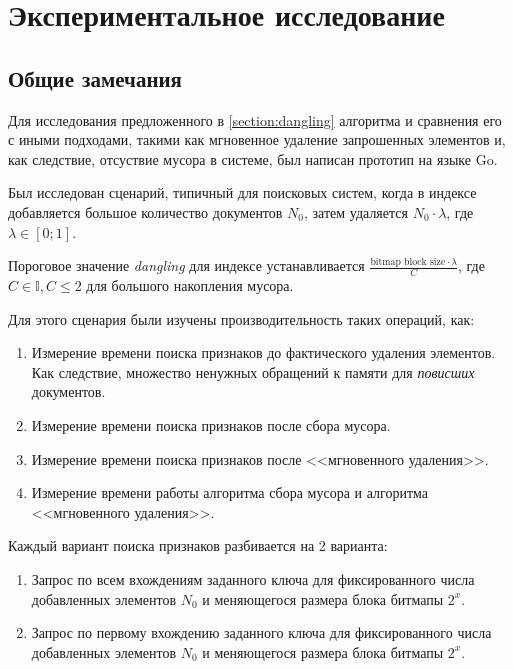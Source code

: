 \newpage
\section{Экспериментальное исследование}

\subsection{Общие замечания}

Для исследования предложенного в \cref{section:dangling} алгоритма и сравнения его с иными
подходами, такими как мгновенное удаление запрошенных элементов и, как следствие, отсуствие
мусора в системе, был написан прототип на языке Go.

Был исследован сценарий, типичный для поисковых систем, когда в индексе добавляется большое
количество документов $N_0$, затем удаляется $N_0\cdot \lambda$, где $\lambda \in [0; 1]$.

Пороговое значение \textit{dangling} для индексе устанавливается
$\frac{\text{bitmap block size} \cdot \lambda}{C}$, где $C \in \mathbb{I}, C \leq 2$ для
большого накопления мусора.

Для этого сценария были изучены производительность таких операций, как:
\begin{enumerate}
    \item Измерение времени поиска признаков до фактического удаления элементов.
    Как следствие, множество ненужных обращений к памяти для \textit{повисших}
    документов.
    \item Измерение времени поиска признаков после сбора мусора.
    \item Измерение времени поиска признаков после <<мгновенного удаления>>.
    \item Измерение времени работы алгоритма сбора мусора и алгоритма <<мгновенного удаления>>.
\end{enumerate}

Каждый вариант поиска признаков разбивается на 2 варианта:
\begin{enumerate}
      \item Запрос по всем вхождениям заданного ключа для фиксированного числа
      добавленных элементов $N_0$ и меняющегося размера блока битмапы $2^{x}$.
      \item Запрос по первому вхождению заданного ключа для фиксированного числа
      добавленных элементов $N_0$ и меняющегося размера блока битмапы $2^{x}$.
\end{enumerate}

